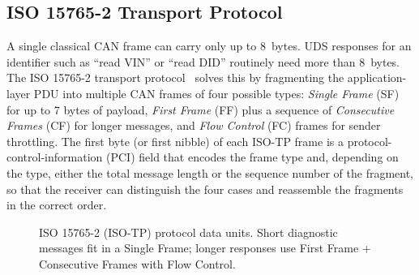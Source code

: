 \documentclass[11pt,a4paper,oneside,parskip=half]{scrreprt}
\begin{document}
\subsection{ISO 15765-2 Transport Protocol}
A single classical CAN frame can carry only up to 8~bytes. UDS responses for an identifier such as ``read VIN'' or ``read DID'' routinely need more than 8~bytes. The ISO 15765-2 transport protocol~\cite{iso15765} solves this by fragmenting the application-layer PDU into multiple CAN frames of four possible types: \textit{Single Frame} (SF) for up to 7 bytes of payload, \textit{First Frame} (FF) plus a sequence of \textit{Consecutive Frames} (CF) for longer messages, and \textit{Flow Control} (FC) frames for sender throttling. The first byte (or first nibble) of each ISO-TP frame is a protocol-control-information (PCI) field that encodes the frame type and, depending on the type, either the total message length or the sequence number of the fragment, so that the receiver can distinguish the four cases and reassemble the fragments in the correct order.

\begin{figure}[H]
\centering
{}
\caption{ISO 15765-2 (ISO-TP) protocol data units. Short diagnostic messages fit in a Single Frame; longer responses use First Frame + Consecutive Frames with Flow Control.}
\label{fig:isotp}
\end{figure}
\end{document}
